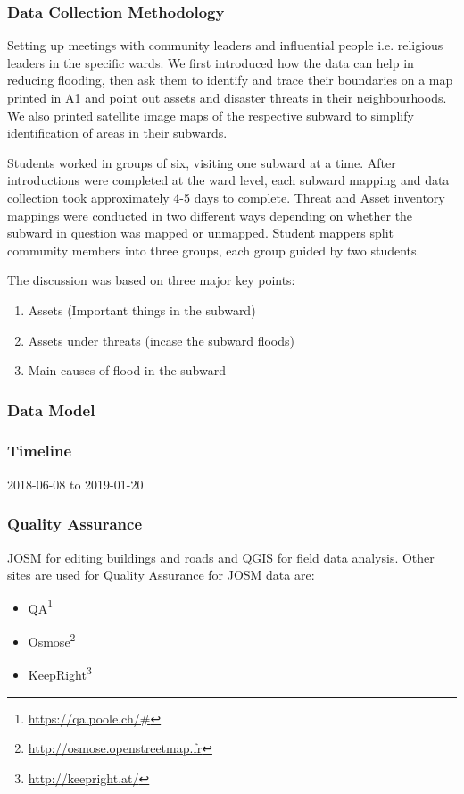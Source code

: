 \documentclass[a4paper,12pt,twoside]{article}
\begin{document}
\subsubsection{Data Collection Methodology}

Setting up meetings with community leaders and influential people i.e. religious leaders in the specific wards. We first introduced how the data can help in reducing flooding, then ask them to identify and trace their boundaries on a map printed in A1 and point out assets and disaster threats in their neighbourhoods. We also printed satellite image maps of the respective subward to simplify identification of areas in their subwards.

Students worked in groups of six, visiting one subward at a time. After introductions were completed at the ward level, each subward mapping and data collection took approximately  4-5 days to complete. Threat and Asset inventory mappings were conducted in two different ways depending on whether the subward in question was mapped or unmapped. Student mappers split community members into three groups, each group guided by two students.

The discussion was based on three major key points:
\begin{enumerate}
    \item Assets (Important things in the subward)
    \item Assets under threats (incase the subward floods)
    \item Main causes of flood in the subward
\end{enumerate}

\subsubsection{Data Model}

\subsubsection{Timeline}
2018-06-08 to 2019-01-20

\subsubsection{Quality Assurance}
JOSM for editing buildings and roads and QGIS for field data analysis. Other sites are used for Quality Assurance for JOSM data are:
\begin{itemize}
    \item \href{https://qa.poole.ch/\#}{QA}\footnote{\url{https://qa.poole.ch/\#}}
    \item \href{http://osmose.openstreetmap.fr}{Osmose}\footnote{\url{http://osmose.openstreetmap.fr}}
    \item \href{http://keepright.at/}{KeepRight}\footnote{\url{http://keepright.at/}}
\end{itemize}
\end{document}

